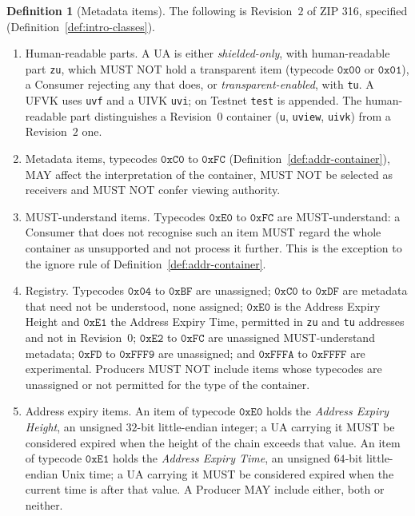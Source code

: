 \documentclass[11pt,a4paper]{article}
\theoremstyle{definition}
\newtheorem{definition}[theorem]{Definition}
\begin{document}
\begin{definition}[Metadata items]\label{def:addr-metadata}
The following is Revision~$2$ of ZIP 316, specified
(Definition~\ref{def:intro-classes}).
\begin{enumerate}
\item Human-readable parts. A UA is either \emph{shielded-only}, with
  human-readable part \texttt{zu}, which MUST NOT hold a transparent item
  (typecode $\mathtt{0x00}$ or $\mathtt{0x01}$), a Consumer rejecting any
  that does, or \emph{transparent-enabled}, with \texttt{tu}. A UFVK uses
  \texttt{uvf} and a UIVK \texttt{uvi}; on Testnet \texttt{test} is
  appended. The human-readable part distinguishes a Revision~$0$ container
  (\texttt{u}, \texttt{uview}, \texttt{uivk}) from a Revision~$2$ one.
\item Metadata items, typecodes $\mathtt{0xC0}$ to $\mathtt{0xFC}$
  (Definition~\ref{def:addr-container}), MAY affect the interpretation of
  the container, MUST NOT be selected as receivers and MUST NOT confer
  viewing authority.
\item MUST-understand items. Typecodes $\mathtt{0xE0}$ to $\mathtt{0xFC}$
  are MUST-understand: a Consumer that does not recognise such an item MUST
  regard the whole container as unsupported and not process it further.
  This is the exception to the ignore rule of
  Definition~\ref{def:addr-container}.
\item Registry. Typecodes $\mathtt{0x04}$ to $\mathtt{0xBF}$ are
  unassigned; $\mathtt{0xC0}$ to $\mathtt{0xDF}$ are metadata that need not
  be understood, none assigned; $\mathtt{0xE0}$ is the Address Expiry
  Height and $\mathtt{0xE1}$ the Address Expiry Time, permitted in
  \texttt{zu} and \texttt{tu} addresses and not in Revision~$0$;
  $\mathtt{0xE2}$ to $\mathtt{0xFC}$ are unassigned MUST-understand
  metadata; $\mathtt{0xFD}$ to $\mathtt{0xFFF9}$ are unassigned; and
  $\mathtt{0xFFFA}$ to $\mathtt{0xFFFF}$ are experimental. Producers MUST
  NOT include items whose typecodes are unassigned or not permitted for the
  type of the container.
\item Address expiry items. An item of typecode $\mathtt{0xE0}$ holds the
  \emph{Address Expiry Height}, an unsigned $32$-bit little-endian integer;
  a UA carrying it MUST be considered expired when the height of the chain
  exceeds that value. An item of typecode $\mathtt{0xE1}$ holds the
  \emph{Address Expiry Time}, an unsigned $64$-bit little-endian Unix time;
  a UA carrying it MUST be considered expired when the current time is
  after that value. A Producer MAY include either, both or neither.

\end{enumerate}
\end{definition}
\end{document}
